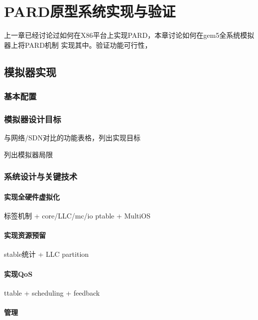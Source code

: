 

\chapter{PARD原型系统实现与验证}
\label{cha:impl}

上一章已经讨论过如何在X86平台上实现PARD，本章讨论如何在gem5全系统模拟器上将PARD机制
实现其中。验证功能可行性，

\section{模拟器实现}
\subsection{基本配置}

\subsection{模拟器设计目标}

与网络/SDN对比的功能表格，列出实现目标

列出模拟器局限

\subsection{系统设计与关键技术}

\subsubsection{实现全硬件虚拟化}

标签机制 + core/LLC/mc/io
ptable + MultiOS

\subsubsection{实现资源预留}

stable统计 + LLC partition

\subsubsection{实现QoS}

ttable + scheduling + feedback

\subsubsection{管理}

